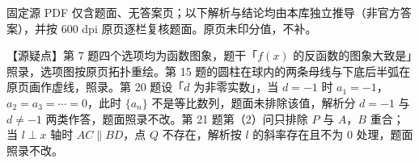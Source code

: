 

\begin{gktip}
固定源 PDF 仅含题面、无答案页；以下解析与结论均由本库独立推导（非官方答案），并按 600 dpi 原页逐栏复核题面。原页未印分值，不补。

【源疑点】第 7 题四个选项均为函数图象，题干「$f(x)$ 的反函数的图象大致是」照录，选项图按原页拓扑重绘。第 15 题的圆柱在球内的两条母线与下底后半弧在原页画作虚线，照录。第 20 题设「$d$ 为非零实数」，当 $d=-1$ 时 $a_1=-1$，$a_2=a_3=\cdots=0$，此时 $\{a_n\}$ 不是等比数列，题面未排除该值，解析分 $d=-1$ 与 $d\neq-1$ 两类作答，题面照录不改。第 21 题第（2）问只排除 $P$ 与 $A$，$B$ 重合；当 $l\perp x$ 轴时 $AC\parallel BD$，点 $Q$ 不存在，解析按 $l$ 的斜率存在且不为 $0$ 处理，题面照录不改。
\end{gktip}

